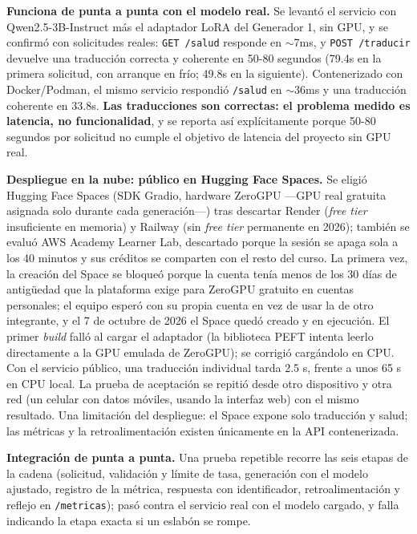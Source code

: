 \documentclass[11pt,a4paper]{article}
\begin{document}
\textbf{Funciona de punta a punta con el modelo real.} Se levantó el servicio con Qwen2.5-3B-Instruct más el adaptador LoRA del Generador 1, sin GPU, y se confirmó con solicitudes reales: \texttt{GET /salud} responde en $\sim$7ms, y \texttt{POST /traducir} devuelve una traducción correcta y coherente en 50-80 segundos (79.4s en la primera solicitud, con arranque en frío; 49.8s en la siguiente). Contenerizado con Docker/Podman, el mismo servicio respondió \texttt{/salud} en $\sim$36ms y una traducción coherente en 33.8s. \textbf{Las traducciones son correctas: el problema medido es latencia, no funcionalidad}, y se reporta así explícitamente porque 50-80 segundos por solicitud no cumple el objetivo de latencia del proyecto sin GPU real.

\textbf{Despliegue en la nube: público en Hugging Face Spaces.} Se eligió Hugging Face Spaces (SDK Gradio, hardware ZeroGPU ---GPU real gratuita asignada solo durante cada generación---) tras descartar Render (\textit{free tier} insuficiente en memoria) y Railway (sin \textit{free tier} permanente en 2026); también se evaluó AWS Academy Learner Lab, descartado porque la sesión se apaga sola a los 40 minutos y sus créditos se comparten con el resto del curso. La primera vez, la creación del Space se bloqueó porque la cuenta tenía menos de los 30 días de antigüedad que la plataforma exige para ZeroGPU gratuito en cuentas personales; el equipo esperó con su propia cuenta en vez de usar la de otro integrante, y el 7 de octubre de 2026 el Space quedó creado y en ejecución. El primer \textit{build} falló al cargar el adaptador (la biblioteca PEFT intenta leerlo directamente a la GPU emulada de ZeroGPU); se corrigió cargándolo en CPU. Con el servicio público, una traducción individual tarda 2.5 s, frente a unos 65 s en CPU local. La prueba de aceptación se repitió desde otro dispositivo y otra red (un celular con datos móviles, usando la interfaz web) con el mismo resultado. Una limitación del despliegue: el Space expone solo traducción y salud; las métricas y la retroalimentación existen únicamente en la API contenerizada.

\textbf{Integración de punta a punta.} Una prueba repetible recorre las seis etapas de la cadena (solicitud, validación y límite de tasa, generación con el modelo ajustado, registro de la métrica, respuesta con identificador, retroalimentación y reflejo en \texttt{/metricas}); pasó contra el servicio real con el modelo cargado, y falla indicando la etapa exacta si un eslabón se rompe.
\end{document}
